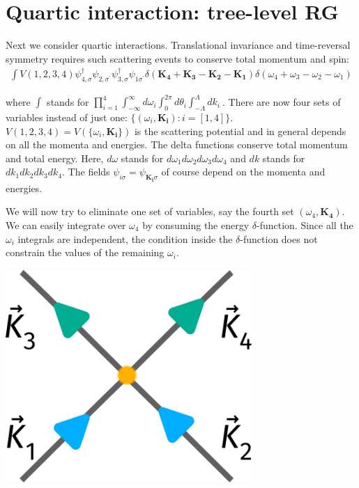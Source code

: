 \documentclass[12pt]{article}
\begin{document}
\section{Quartic interaction: tree-level RG}
Next we consider quartic interactions. Translational invariance and time-reversal symmetry requires such scattering events to conserve total momentum and spin:
\begin{equation}\begin{aligned}
	\int V(1,2,3,4)\psi_{4,\sigma}^\dagger\psi_{2,\sigma^\prime}\psi_{3,\sigma}^\dagger\psi_{1\sigma^\prime} \delta(\mathbf{K_4}+\mathbf{K_3} - \mathbf{K_2} - \mathbf{K_1})\delta({\omega_4}+{\omega_3} - {\omega_2} - {\omega_1})
\end{aligned}\end{equation}
\begin{minipage}{0.6\textwidth}
where \(\int\) stands for  \(\prod_{i=1}^4\int_{-\infty}^\infty d\omega_i \int_{0}^{2\pi}d\theta_i \int_{-\Lambda}^\Lambda dk_i~\). There are now four sets of variables instead of just one: \(\{(\omega_i, \mathbf{K_i}) : i=[1,4]\}\). \(V(1,2,3,4) = V(\{\omega_i, \mathbf{K_i}\})\) is the scattering potential and in general depends on all the momenta and energies. The delta functions conserve total momentum and total energy. Here, \(d\omega\) stands for \(d\omega_1d\omega_2d\omega_3d\omega_4\) and \(dk\) stands for \(dk_1dk_2dk_3dk_4\). The fields \(\psi_{i\sigma} = \psi_{\mathbf{K_i}\sigma}\) of course depend on the momenta and energies. 

We will now try to eliminate one set of variables, say the fourth set \((\omega_4, \mathbf{K_4})\). We can easily integrate over \(\omega_4\) by consuming the energy \(\delta\)-function. Since all the \(\omega_i\) integrals are independent, the condition inside the \(\delta\)-function does not constrain the values of the remaining \(\omega_i\).
\end{minipage}
\hspace*{\fill}
\begin{minipage}{0.3\textwidth}
\begin{center}\includegraphics[width=0.7\textwidth]{./figures/term.pdf}\end{center}
\end{minipage}
\end{document}
